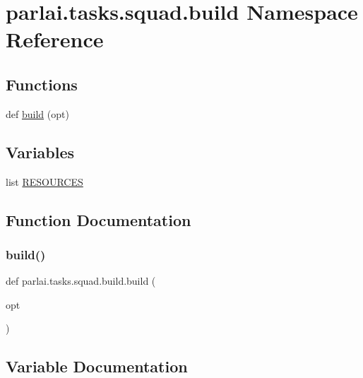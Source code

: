 \hypertarget{namespaceparlai_1_1tasks_1_1squad_1_1build}{}\section{parlai.\+tasks.\+squad.\+build Namespace Reference}
\label{namespaceparlai_1_1tasks_1_1squad_1_1build}
\subsection*{Functions}
\begin{DoxyCompactItemize}
\item 
def \hyperlink{namespaceparlai_1_1tasks_1_1squad_1_1build_aaf903c1fa0ac0b6cd2e9eb37d5d001a1}{build} (opt)
\end{DoxyCompactItemize}
\subsection*{Variables}
\begin{DoxyCompactItemize}
\item 
list \hyperlink{namespaceparlai_1_1tasks_1_1squad_1_1build_acef38cd4f8704e7c30b49e1c959521b2}{R\+E\+S\+O\+U\+R\+C\+ES}
\end{DoxyCompactItemize}


\subsection{Function Documentation}
\mbox{\label{namespaceparlai_1_1tasks_1_1squad_1_1build_aaf903c1fa0ac0b6cd2e9eb37d5d001a1}} 
\subsubsection{\texorpdfstring{build()}{build()}}
{\footnotesize\ttfamily def parlai.\+tasks.\+squad.\+build.\+build (\begin{DoxyParamCaption}\item[{}]{opt }\end{DoxyParamCaption})}



\subsection{Variable Documentation}
\mbox{\label{namespaceparlai_1_1tasks_1_1squad_1_1build_acef38cd4f8704e7c30b49e1c959521b2}} 
